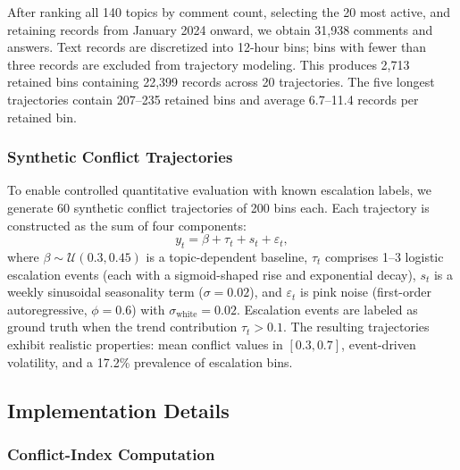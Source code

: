 \documentclass[journal]{IEEEtran}
\begin{document}
After ranking all 140 topics by comment count, selecting the 20 most active, and retaining records from January 2024 onward, we obtain 31,938 comments and answers. Text records are discretized into 12-hour bins; bins with fewer than three records are excluded from trajectory modeling. This produces 2,713 retained bins containing 22,399 records across 20 trajectories. The five longest trajectories contain 207--235 retained bins and average 6.7--11.4 records per retained bin.

\subsubsection{Synthetic Conflict Trajectories}

To enable controlled quantitative evaluation with known escalation labels, we generate 60 synthetic conflict trajectories of 200 bins each. Each trajectory is constructed as the sum of four components:
\begin{equation}
y_t = \beta + \tau_t + s_t + \varepsilon_t,
\label{eq:synthetic}
\end{equation}
where $\beta \sim \mathcal{U}(0.3, 0.45)$ is a topic-dependent baseline, $\tau_t$ comprises 1--3 logistic escalation events (each with a sigmoid-shaped rise and exponential decay), $s_t$ is a weekly sinusoidal seasonality term ($\sigma=0.02$), and $\varepsilon_t$ is pink noise (first-order autoregressive, $\phi=0.6$) with $\sigma_{\text{white}}=0.02$. Escalation events are labeled as ground truth when the trend contribution $\tau_t > 0.1$. The resulting trajectories exhibit realistic properties: mean conflict values in $[0.3, 0.7]$, event-driven volatility, and a 17.2\% prevalence of escalation bins.

\subsection{Implementation Details}
\label{sec:impl}

\subsubsection{Conflict-Index Computation}
\end{document}
